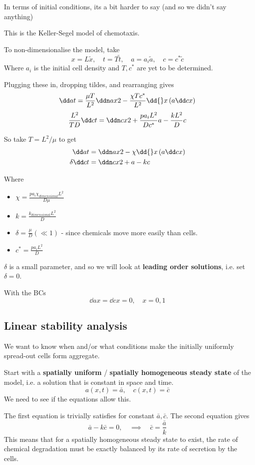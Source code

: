 \documentclass{X:/Documents/Coding/Latex/myassignment}
\begin{document}
In terms of initial conditions, its a bit harder to say (and so we didn't say anything)

This is the Keller-Segel model of chemotaxis.


To non-dimensionalise the model, take
\[x = L\tilde{x}, \quad t = T\tilde{t},\quad a = a_i \tilde{a}, \quad c= c^*\tilde{c}\]
Where $a_i$ is the initial cell density and $T, c^*$ are yet to be determined.

Plugging these in, dropping tildes, and rearranging gives
\[\dd at = \frac{\mu T}{L^2} \ddn ax2 - \frac{\chi Tc^*}{L^2} \dd{}x \left(a \dd cx\right)\]
\[\frac{L^2}{TD} \dd ct = \ddn cx2 + \frac{pa_iL^2}{Dc^*} a - \frac{kL^2}{D} c\]

So take $T = L^2/\mu$ to get
\begin{align*}
	\dd at &= \ddn ax2 - \chi \dd{}x \left(a \dd cx\right)\\
	\delta \dd ct &= \ddn cx2 + a - kc
\end{align*}

Where
\begin{itemize}
	\item  $\chi = \frac{pa_i \chi_{dimensional} L^2}{D\mu}$
	\item $k = \frac{k_{dimensional} L^2}{D}$
	\item $\delta = \frac{\mu}{D} (\ll 1)$ - since chemicals move more easily than cells.
	\item $c^* = \frac{pa_iL^2}{D}$ 
\end{itemize}

$\delta$ is a small parameter, and so we will look at \textbf{leading order solutions}, i.e. set $\delta = 0$.


With the BCs
\[\dd ax = \dd cx = 0, \quad x=0,1\]


\subsection{Linear stability analysis}
We want to know when and/or what conditions make the initially uniformly spread-out cells form aggregate.

Start with a \textbf{spatially uniform} / \textbf{spatially homogeneous steady state} of the model, i.e. a solution that is constant in space and time.
\[a(x,t) = \bar{a}, \quad c(x,t) = \bar{c}\] 
We need to see if the equations allow this.

The first equation is trivially satisfies for constant $\bar{a},\bar{c}$. The second equation gives
\[\bar{a} - k\bar{c} = 0 , \quad \implies \quad \bar{c} = \frac{\bar{a}}{k}\]
This means that for a spatially homogeneous steady state to exist, the rate of chemical degradation must be exactly balanced by its rate of secretion by the cells.
\end{document}
